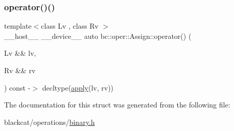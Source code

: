 \mbox{\label{structbc_1_1oper_1_1Assign_a8cb1c55dee85e0040c9c6130656ac2c3}} 
\subsubsection{\texorpdfstring{operator()()}{operator()()}}
{\footnotesize\ttfamily template$<$class Lv , class Rv $>$ \\
\+\_\+\+\_\+host\+\_\+\+\_\+ \+\_\+\+\_\+device\+\_\+\+\_\+ auto bc\+::oper\+::\+Assign\+::operator() (\begin{DoxyParamCaption}\item[{Lv \&\&}]{lv,  }\item[{Rv \&\&}]{rv }\end{DoxyParamCaption}) const -\/$>$ decltype(\hyperlink{structbc_1_1oper_1_1Assign_a1e478dc4379526354bb93cb91a2cb9a8}{apply}(lv, rv)) \hspace{0.3cm}{\ttfamily [inline]}}



The documentation for this struct was generated from the following file\+:\begin{DoxyCompactItemize}
\item 
blackcat/operations/\hyperlink{binary_8h}{binary.\+h}\end{DoxyCompactItemize}
